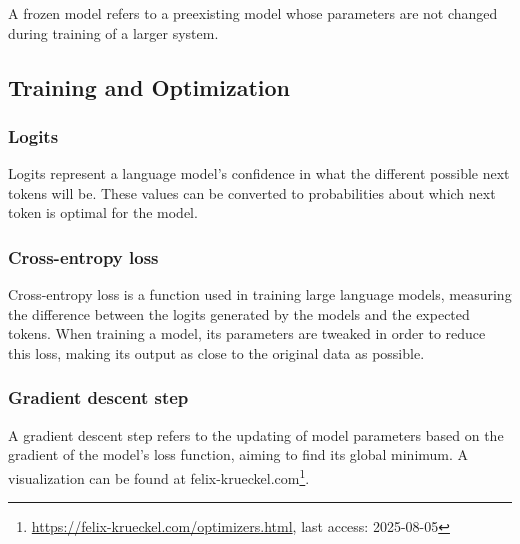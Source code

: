 \documentclass[a4paper,12pt,twoside]{article}
\newenvironment{aigen}{\begin{tcolorbox}[colback=blue!5!white, colframe=blue!75!black, title=AI-Generated Section]}{\end{tcolorbox}}
\begin{document}
A frozen model refers to a preexisting model whose parameters are not changed during training of a larger system.

\subsection{Training and Optimization}


\subsubsection*{Logits}\label{sec:Logit}

Logits represent a language model's confidence in what the different possible next tokens will be. These values can be converted to probabilities about which next token is optimal for the model.

\subsubsection*{Cross-entropy loss}\label{sec:crossEntropyLoss}

Cross-entropy loss is a function used in training large language models, measuring the difference between the logits generated by the models and the expected tokens. When training a model, its parameters are tweaked in order to reduce this loss, making its output as close to the original data as possible.

\subsubsection*{Gradient descent step}\label{sec:gradientDescent}

A gradient descent step refers to the updating of model parameters based on the gradient of the model's loss function, aiming to find its global minimum. A visualization can be found at felix-krueckel.com\footnote{\url{https://felix-krueckel.com/optimizers.html}, last access: 2025-08-05}.
\end{document}
